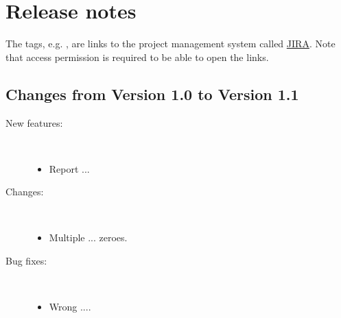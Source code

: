 \chapter{Release notes}
The tags, e.g. , are links to the \crava project management
system called
\href{http://www.atlassian.com/software/jira/}{JIRA}.
 Note that access permission is
required to be able to open the links.

\section{Changes from \crava Version 1.0 to Version 1.1}

\begin{description}

\item [New features:] \mbox{ }
  \begin{itemize}
    \item Report ... 
 \end{itemize}

\item [Changes:] \mbox{ }
  \begin{itemize}
    \item Multiple ... zeroes.  
  \end{itemize}

\item [Bug fixes:] \mbox{ }
  \begin{itemize}
    \item Wrong .... 
 \end{itemize}
\end{description}
